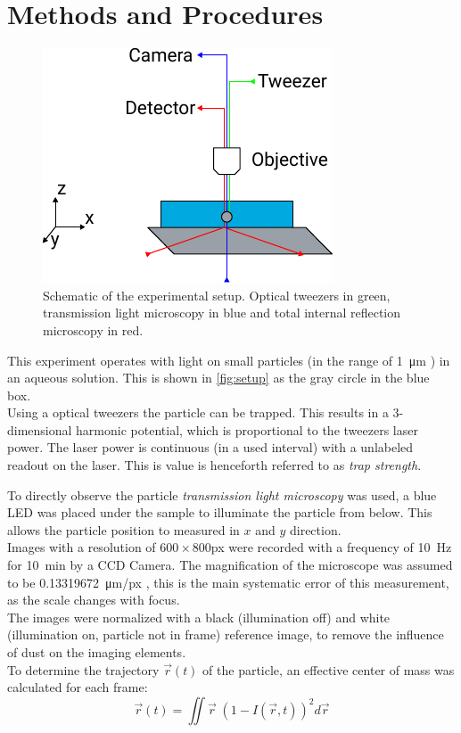 \documentclass[
    twoside=false,
    twocolumn=true,
    fontsize=11pt,
]{scrarticle}
\begin{document}
\section{Methods and Procedures}
\begin{figure}
    \centering
    \includegraphics{figures/setup.pdf}
    \caption{Schematic of the experimental setup. Optical tweezers in green, transmission light microscopy in blue and total internal reflection microscopy in red.}
    \label{fig:setup}
\end{figure}
This experiment operates with light on small particles (in the range of \SI{1}{\micro m} \cite{instructions}) in an aqueous solution.
This is shown in \autoref{fig:setup} as the gray circle in the blue box. \\
Using a optical tweezers the particle can be trapped.
This results in a 3-dimensional harmonic potential, which is proportional to the tweezers laser power.
The laser power is continuous (in a used interval) with a unlabeled readout on the laser.
This is value is henceforth referred to as \emph{trap strength}.

To directly observe the particle \emph{transmission light microscopy} was used, a blue LED was placed under the sample to illuminate the particle from below.
This allows the particle position to measured in $x$ and $y$ direction.\\
Images with a resolution of $600\times 800$\si{px} were recorded with a frequency of \SI{10}{Hz} for \SI{10}{min} by a CCD Camera.
The magnification of the microscope was assumed to be \SI{0.13319672}{\micro m/px} \cite{instructions}, this is the main systematic error of this measurement, as the scale changes with focus.\\
The images were normalized with a black (illumination off) and white (illumination on, particle not in frame) reference image, to remove the influence of dust on the imaging elements.\\
To determine the trajectory $\vec r(t)$ of the particle, an effective center of mass was calculated for each frame:
\begin{equation}
    \vec{r}(t) = \iint \vec{r} \; \left(1-I(\vec{r}, t)\right)^2 d\vec{r}    
\end{equation}
\end{document}
